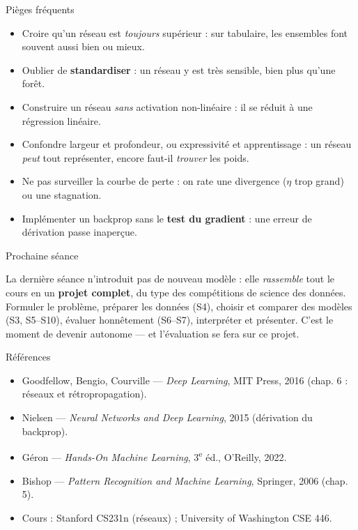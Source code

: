 \documentclass[aspectratio=169,11pt]{beamer}
\begin{document}
\begin{frame}{Pièges fréquents}
\begin{itemize}\small
  \item Croire qu'un réseau est \emph{toujours} supérieur : sur tabulaire, les ensembles font souvent aussi bien ou mieux.
  \item Oublier de \textbf{standardiser} : un réseau y est très sensible, bien plus qu'une forêt.
  \item Construire un réseau \emph{sans} activation non-linéaire : il se réduit à une régression linéaire.
  \item Confondre largeur et profondeur, ou expressivité et apprentissage : un réseau \emph{peut} tout représenter, encore faut-il \emph{trouver} les poids.
  \item Ne pas surveiller la courbe de perte : on rate une divergence ($\eta$ trop grand) ou une stagnation.
  \item Implémenter un backprop sans le \textbf{test du gradient} : une erreur de dérivation passe inaperçue.
\end{itemize}
\end{frame}

\begin{frame}{Prochaine séance}
\begin{ucadfront}
{\small La dernière séance n'introduit pas de nouveau modèle : elle \emph{rassemble} tout le cours en un \textbf{projet complet}, du type des compétitions de science des données. Formuler le problème, préparer les données (S4), choisir et comparer des modèles (S3, S5–S10), évaluer honnêtement (S6–S7), interpréter et présenter. C'est le moment de devenir autonome — et l'évaluation se fera sur ce projet.}
\end{ucadfront}
\end{frame}

\begin{frame}{Références}
\begin{itemize}\small
  \item Goodfellow, Bengio, Courville — \emph{Deep Learning}, MIT Press, 2016 (chap. 6 : réseaux et rétropropagation).
  \item Nielsen — \emph{Neural Networks and Deep Learning}, 2015 (dérivation du backprop).
  \item Géron — \emph{Hands-On Machine Learning}, 3\textsuperscript{e} éd., O'Reilly, 2022.
  \item Bishop — \emph{Pattern Recognition and Machine Learning}, Springer, 2006 (chap. 5).
  \item Cours : Stanford CS231n (réseaux) ; University of Washington CSE 446.
\end{itemize}
\end{frame}
\end{document}

